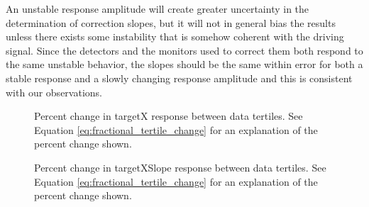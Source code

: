 An unstable response amplitude will create greater uncertainty in the determination of correction slopes, but it will not in general bias the results unless there exists some instability that is somehow coherent with the driving signal. Since the detectors and the monitors used to correct them both respond to the same unstable behavior, the slopes should be the same within error for both a stable response and a slowly changing response amplitude and this is consistent with our observations.


\begin{landscape}
\begin{figure}[t]

\centering
{}
\caption{Percent change in targetX response between data tertiles. See Equation \ref{eq:fractional_tertile_change} for an explanation of the percent change shown.}

\label{fig:tert_coeffX}
\end{figure}

\begin{figure}[t]

\centering
{}
\caption{Percent change in targetXSlope response between data tertiles. See Equation \ref{eq:fractional_tertile_change} for an explanation of the percent change shown.}


\end{figure}
\end{landscape}
